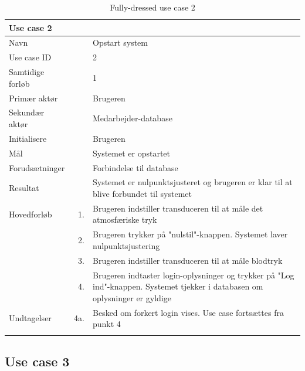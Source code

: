 \begin{longtabu} to  %
    {\large \textbf{Use case 2}} && \\
    \toprule
    Navn &&    Opstart system\\
    Use case ID &&    2\\
    Samtidige forløb &&    1\\
    Primær aktør &&    Brugeren\\
    Sekundær aktør && Medarbejder-database\\
    Initialisere &&    Brugeren\\
    Mål && Systemet er opstartet\\
    Forudsætninger &&  Forbindelse til database\\
    Resultat &&    Systemet er nulpunktsjusteret og brugeren er klar til at blive forbundet til systemet\\
    \midrule
    Hovedforløb &   1. & Brugeren indstiller transduceren til at måle det atmosfæriske tryk\\ 
    	&			2. & Brugeren trykker på "nulstil"\--knappen. Systemet laver nulpunktsjustering \\ 
    	& 			3. & Brugeren indstiller transduceren til at måle blodtryk\\
    	&			4. &    Brugeren indtaster login-oplysninger og trykker på "Log ind"\--knappen. Systemet tjekker i databasen om oplysninger er gyldige \\
    	\midrule
    Undtagelser &    4a. & Besked om forkert login vises. Use case fortsættes fra punkt 4     \\ \bottomrule    
\caption{Fully-dressed use case 2}
\label{UC2}
\end{longtabu}

\subsection{Use case 3}

